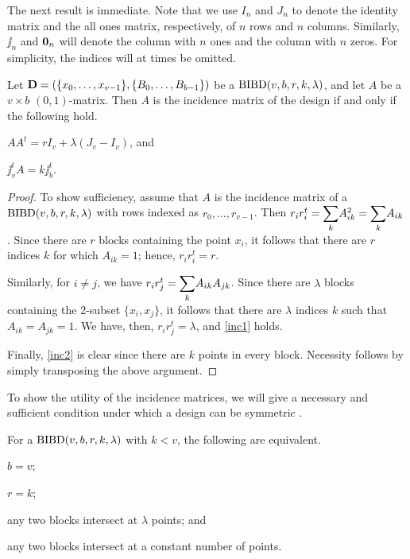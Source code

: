\documentclass[../../../main]{subfiles}
\begin{document}
The next result is immediate. Note that we use $I_n$ and $J_n$ to denote the identity matrix and the all ones matrix, respectively, of $n$ rows and $n$ columns. Similarly, $\jj_n$ and $\mathbf{0}_n$ will denote the column with $n$ ones and the column with $n$ zeros. For simplicity, the indices will at times be omitted.

\begin{prop}\label{incidence prop}
 Let $\mathbf{D}=(\{x_0, \dots, x_{v-1}\},\{B_0, \dots, B_{b-1}\})$ be a $\text{BIBD}(v,b,r,k,\lambda)$, and let $A$ be a $v \times b$ $(0,1)$-matrix. Then $A$ is the incidence matrix of the design if and only if the following hold.
 \begin{defenum}
 \item\label{inc1} $AA^t = rI_v + \lambda(J_v - I_v)$, and
  \item\label{inc2} $\jj_v^tA = k\jj_b^t$.
 \end{defenum}
\end{prop}

\begin{proof}
 To show sufficiency, assume that $A$ is the incidence matrix of a $\text{BIBD}(v,b,r,k,\lambda)$ with rows indexed as $r_0, \dots, r_{v-1}$. Then $r_ir_i^t = \ssum_k A_{ik}^2 = \ssum_k A_{ik}$. Since there are $r$ blocks containing the point $x_i$, it follows that there are $r$ indices $k$ for which $A_{ik} = 1$; hence, $r_ir_i^t = r$. 
 
 Similarly, for $i \neq j$, we have $r_ir_j^t = \ssum_k A_{ik}A_{jk}$. Since there are $\lambda$ blocks containing the 2-subset $\{x_i,x_j\}$, it follows that there are $\lambda$ indices $k$ such that $A_{ik} = A_{jk} = 1$. We have, then, $r_ir_j^t = \lambda$, and \ref{inc1} holds.
 
 Finally, \ref{inc2} is clear since there are $k$ points in every block. Necessity follows by simply transposing the above argument.
\end{proof}

To show the utility of the incidence matrices, we will give a necessary and sufficient condition under which a design can be symmetric \cite[see][Theorem 1.14]{designs-codes-graphs-and-their-links}.

\begin{prop}\label{square-properties}
 For a $\text{BIBD}(v,b,r,k,\lambda)$ with $k < v$, the following are equivalent.
 \begin{defenum}
  \item\label{b=v} $b = v$;
  \item\label{r=k} $r = k$;
  \item\label{lambda-intersect} any two blocks intersect at $\lambda$ points; and
  \item\label{const-intersect} any two blocks intersect at a constant number of points.
  \end{defenum}
\end{prop}
\end{document}
